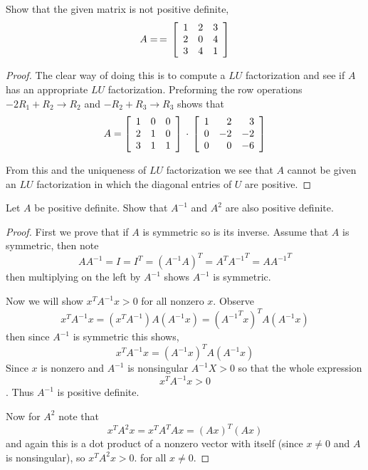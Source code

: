 \newpage 
\question 
Show that the given matrix is not positive definite, 
\begin{equation}
    A =\, = \, 
    \mat{rrr}
    1 & 2 & 3 \\ 
    2 & 0 & 4 \\ 
    3 & 4 & 1 
    \rix 
\end{equation}

\begin{proof}
    The clear way of doing this is to compute a $LU$ factorization and see if $A$ has an appropriate $LU$ factorization.
    Preforming the row operations $-2R_1 + R_2 \to R_2$ and $-R_2 + R_3 \to R_3$ shows that 
    \begin{equation}
        A = 
        \mat{rrr}
        1 & 0 & 0 \\ 
        2 & 1 & 0 \\ 
        3 & 1 & 1 
        \rix
        \, \cdot \, 
        \mat{rrr}
        1 & 2 & 3 \\ 
        0 & -2 & -2 \\ 
        0 & 0 & -6 
        \rix
    \end{equation}

    From this and the uniqueness of $LU$ factorization we see that $A$ cannot be given an $LU$ factorization in which the diagonal entries of $U$ are positive. 
\end{proof}

\newpage 
\question 
Let $A$ be positive definite. Show that $A^{-1}$ and $A^2$ are also positive definite. 

\begin{proof}
    First we prove that if $A$ is symmetric so is its inverse. Assume that $A$ is symmetric, then note 
    \[ AA^{-1} = I = I^T = (A^{-1}A)^T = A^T{A^{-1}}^T = A{A^{-1}}^T \]
    then multiplying on the left by $A^{-1}$ shows $A^{-1}$ is symmetric. 

    Now we will show $x^T A^{-1} x > 0$ for all nonzero $x$. Observe 
    \[x^T A^{-1} x  = (x^T A^{-1})A(A^{-1} x) = ({A^{-1}}^Tx)^T A (A^{-1}x) \]
    then since $A^{-1}$ is symmetric this shows, 
    \[x^T A^{-1} x =  (A^{-1}x)^T A (A^{-1}x) \]
    Since $x$ is nonzero and $A^{-1}$ is nonsingular $A^{-1}X > 0$ so that the whole expression 
    \[x^T A^{-1}x > 0\]. 
    Thus $A^{-1}$ is positive definite. 

    Now for $A^2$ note that 
    \[x^TA^2x = x^TA^TAx = (Ax)^T(Ax)\]
    and again this is a dot product of a nonzero vector with itself (since $x \neq 0$ and $A$ is nonsingular), so $x^T A^2 x > 0$. 
    for all $x \neq 0$. 


    
\end{proof}


